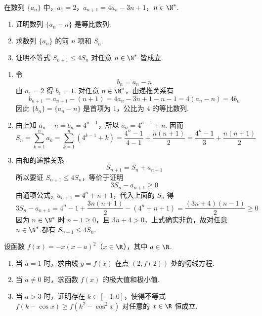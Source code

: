 \begin{problem}
在数列 \(\{a_{n}\}\) 中，\(a_{1} = 2\)，\(a_{n + 1} = 4a_{n} - 3n + 1\)，\(n \in \N^*\).

\begin{enumerate}
\item 证明数列 \(\{a_{n}-n\}\) 是等比数列.
\item 求数列 \(\{a_{n}\}\) 的前 \(n\) 项和 \(S_n\).
\item 证明不等式 \(S_{n+1} \leqslant 4S_n\) 对任意 \(n \in \N^*\) 皆成立.
\end{enumerate}
\end{problem}

\begin{solution}
\begin{enumerate}
\item 令
\[
b_n=a_n-n
\]
由 \(a_1=2\) 得 \(b_1=1\). 对任意 \(n\in\N^*\)，由递推关系有
\[
b_{n+1}=a_{n+1}-(n+1)=4a_n-3n+1-n-1=4(a_n-n)=4b_n
\]
因此 \(\{b_n\}=\{a_n-n\}\) 是首项为 \(1\)，公比为 \(4\) 的等比数列.
\item 由上知 \(a_n-n=b_n=4^{n-1}\)，所以 \(a_n=4^{n-1}+n\). 因而
\[
S_n=\sum_{k=1}^{n}a_k
=\sum_{k=1}^{n}\left(4^{k-1}+k\right)
=\frac{4^n-1}{4-1}+\frac{n(n+1)}2
=\frac{4^n-1}{3}+\frac{n(n+1)}2
\]
\item 由和的递推关系
\[
S_{n+1}=S_n+a_{n+1}
\]
所以要证 \(S_{n+1}\leqslant4S_n\)，等价于证明
\[
3S_n-a_{n+1}\geqslant0
\]
由通项公式，\(a_{n+1}=4^n+n+1\)，代入上面的 \(S_n\) 得
\[
3S_n-a_{n+1}=4^n-1+\frac{3n(n+1)}2-(4^n+n+1)=\frac{(3n+4)(n-1)}2\geqslant0
\]
因为 \(n\in\N^*\) 时 \(n-1\geqslant0\)，且 \(3n+4>0\)，上式确实非负，故对任意 \(n\in\N^*\) 都有 \(S_{n+1}\leqslant4S_n\).
\end{enumerate}
\end{solution}

\begin{problem}
设函数 \(f(x) = -x(x - a)^2\)（\(x \in \R\)），其中 \(a \in \R\).

\begin{enumerate}
\item 当 \(a = 1\) 时，求曲线 \(y = f(x)\) 在点 \((2, f(2))\) 处的切线方程.
\item 当 \(a \neq 0\) 时，求函数 \(f(x)\) 的极大值和极小值.
\item 当 \(a > 3\) 时，证明存在 \(k \in [-1,0]\)，使得不等式 \(f(k - \cos x) \geqslant f(k^2 - \cos^2 x)\) 对任意的 \(x \in \R\) 恒成立.
\end{enumerate}
\end{problem}

